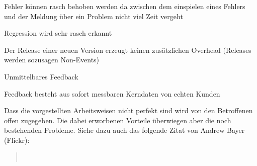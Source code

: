 \begin{itemize*}
    \item Fehler können rasch behoben werden da zwischen dem einspielen eines
          Fehlers und der Meldung über ein Problem nicht viel Zeit vergeht
    \item Regression wird sehr rasch erkannt
    \item Der Release einer neuen Version erzeugt keinen zusätzlichen Overhead
          (Releases werden sozusagen Non-Events) 
    \item Unmittelbares Feedback
    \item Feedback besteht aus sofort messbaren Kerndaten von echten Kunden
\end{itemize*}

Dass die vorgestellten Arbeitsweisen nicht perfekt sind wird von den
Betroffenen offen zugegeben. Die dabei erworbenen Vorteile überwiegen aber die
noch bestehenden Probleme. Siehe dazu auch das folgende Zitat von Andrew Bayer (Flickr):

\begin{quote}
~\cite{digg4}
\end{quote}

